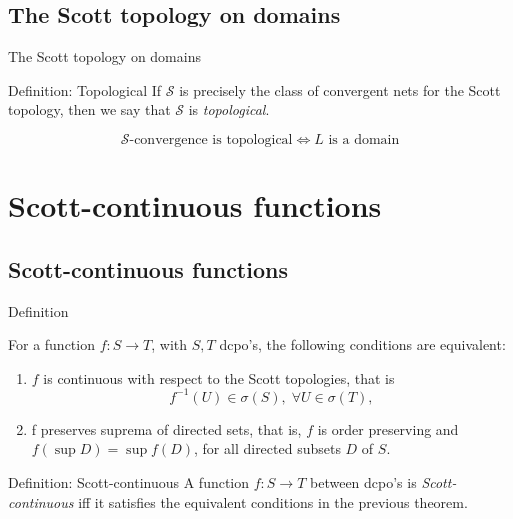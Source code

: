 \documentclass{beamer}
\begin{document}
\subsection{The Scott topology on domains}
\begin{frame}{The Scott topology on domains}
\begin{block}{Definition: Topological}
If $\mathcal{S}$ is precisely the class of convergent nets for the Scott topology, then we say that $\mathcal{S}$ is \emph{topological}.
\end{block}

\begin{theorem}
$$\mathcal{S}\text{-convergence is topological} \Leftrightarrow L \text{ is a domain}$$
\end{theorem}
\end{frame}

\section{Scott-continuous functions}
\subsection{Scott-continuous functions}
\begin{frame}{Definition}
\begin{theorem}
For a function $f: S \rightarrow T$, with $S,T$ dcpo's, the following conditions are equivalent:
\begin{enumerate}
    \item $f$ is continuous with respect to the Scott topologies, that is $$f^{-1}(U) \in \sigma(S),\; \forall U \in \sigma(T),$$
    \item f preserves suprema of directed sets, that is, $f$ is order preserving and $f(\sup D) = \sup f(D)$, for all directed subsets $D$ of $S$.
\end{enumerate}
\end{theorem}

\begin{block}{Definition: Scott-continuous}
A function $f: S \rightarrow T$ between dcpo's is \emph{Scott-continuous} iff it satisfies the equivalent conditions in the previous theorem.
\end{block}
\end{frame}
\end{document}
